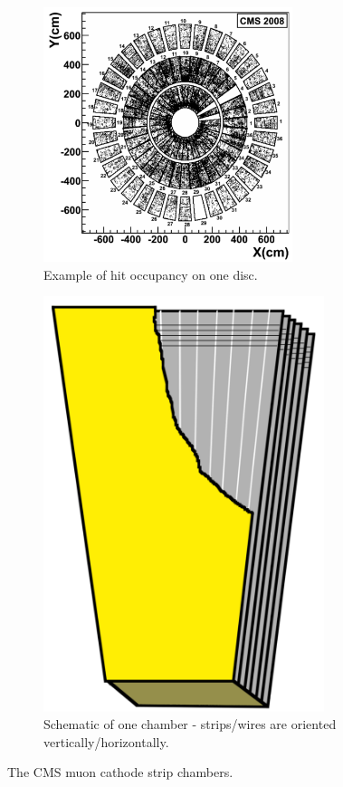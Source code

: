 \begin{figure}[hb!]
\centering
\begin{subfigure}[b]{0.55\textwidth}
\includegraphics[width=0.8\textwidth]{figs/cscring.png}
\caption{Example of hit occupancy on one disc.}
\label{fig:cscring}
\end{subfigure}
\begin{subfigure}[b]{0.3\textwidth}
\includegraphics[width=0.9\textwidth]{figs/cscchamber.png}
\caption{Schematic of one chamber - strips/wires are oriented vertically/horizontally.}
\label{fig:cscchamber}
\end{subfigure}
\caption{The CMS muon cathode strip chambers.}
\end{figure}

